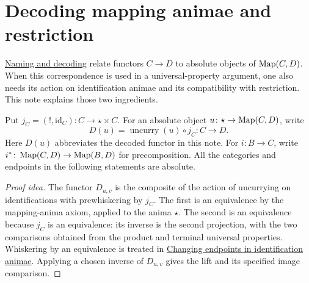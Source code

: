 \documentclass[11pt]{article}
\begin{document}
\section*{Decoding mapping animae and restriction}

\href{mapping-animae.html\#con:Functors_As_Points_Of_Mapping_Animae}{Naming and decoding}
relate functors $C\to D$ to absolute objects of $\operatorname{Map}(C,D)$.
When this correspondence is used in a universal-property argument, one
also needs its action on identification animae and its compatibility with
restriction. This note explains those two ingredients.

Put $j_C=(!,\mathrm{id}_C)\colon C\to\star\times C$. For an absolute
object $u\colon\star\to\operatorname{Map}(C,D)$, write
\[
 D(u)=\operatorname{uncurry}(u)\circ j_C\colon C\to D.
\]
Here $D(u)$ abbreviates the decoded functor in this note. For
$i\colon B\to C$, write $i^*\colon\operatorname{Map}(C,D)\to\operatorname{Map}(B,D)$ for
precomposition. All the categories and endpoints in the following
statements are absolute.

\begin{proof}[Proof idea]
The functor $D_{u,v}$ is the composite of the action of uncurrying on
identifications with prewhiskering by $j_C$. The first is an equivalence
by the mapping-anima axiom, applied to the anima $\star$.
The second is an equivalence because $j_C$ is an equivalence: its inverse
is the second projection, with the two comparisons obtained from the
product and terminal universal properties. Whiskering by an equivalence
is treated in \href{supplementary-changing-endpoints.html}{Changing endpoints
in identification animae}. Applying a chosen inverse of $D_{u,v}$ gives
the lift and its specified image comparison.
\end{proof}
\end{document}
